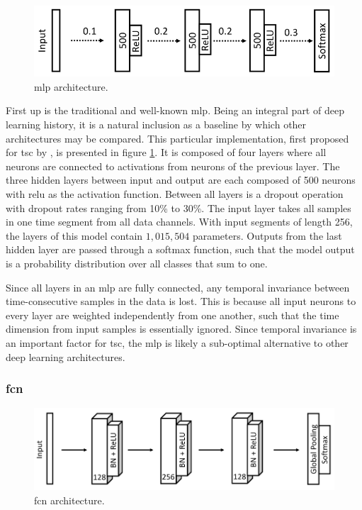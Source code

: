\begin{figure}[h]
    \centering
    \includegraphics[width=\textwidth]{figures/impl_MLP.png}
    \caption{\acrlong{mlp} architecture.}
    \label{fig:impl_MLP}
\end{figure}

First up is the traditional and well-known \acrfull{mlp}. Being an integral part of deep learning history, it is a natural inclusion as a baseline by which other architectures may be compared. This particular implementation, first proposed for \acrshort{tsc} by \textcite{wang2016}, is presented in figure \ref{fig:impl_MLP}. It is composed of four layers where all neurons are connected to activations from neurons of the previous layer. The three hidden layers between input and output are each composed of 500 neurons with \acrshort{relu} as the activation function. Between all layers is a dropout operation with dropout rates ranging from 10\% to 30\%. The input layer takes all samples in one time segment from all data channels. With input segments of length 256, the layers of this model contain $1,015,504$ parameters. Outputs from the last hidden layer are passed through a softmax function, such that the model output is a probability distribution over all classes that sum to one.

Since all layers in an \acrshort{mlp} are fully connected, any temporal invariance between time-consecutive samples in the data is lost. This is because all input neurons to every layer are weighted independently from one another, such that the time dimension from input samples is essentially ignored. Since temporal invariance is an important factor for \acrshort{tsc}, the \acrshort{mlp} is likely a sub-optimal alternative to other deep learning architectures. 

\newpage
\subsubsection{\acrlong{fcn}}

\begin{figure}[h]
    \centering
    \includegraphics[width=\textwidth]{figures/impl_FCN.png}
    \caption{\acrlong{fcn} architecture.}
    \label{fig:impl_FCN}
\end{figure}

